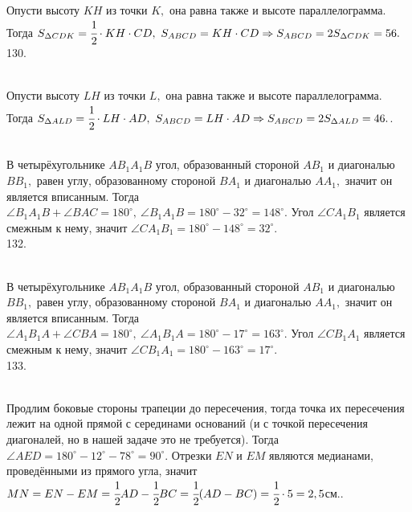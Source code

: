 Опусти высоту $KH$ из точки $K,$ она равна также и высоте параллелограмма. Тогда $S_{\Delta CDK}=\cfrac{1}{2}\cdot KH\cdot CD,\ S_{ABCD}=KH\cdot CD\Rightarrow
S_{ABCD}=2S_{\Delta CDK}=56.$\\
130. \begin{figure}[ht!]
\end{figure}\\
Опусти высоту $LH$ из точки $L,$ она равна также и высоте параллелограмма. Тогда $S_{\Delta ALD}=\cfrac{1}{2}\cdot LH\cdot AD,\ S_{ABCD}=LH\cdot AD\Rightarrow
S_{ABCD}=2S_{\Delta ALD}=46.$\newpage{}. \begin{figure}[ht!]
\end{figure}\\
В четырёхугольнике $AB_1A_1B$ угол, образованный стороной $AB_1$ и диагональю $BB_1,$ равен углу, образованному стороной $BA_1$ и диагональю $AA_1,$ значит он является вписанным. Тогда $\angle B_1A_1B+\angle BAC=180^\circ,\ \angle B_1A_1B=180^\circ-32^\circ=148^\circ.$ Угол $\angle CA_1B_1$ является смежным к нему, значит $\angle CA_1B_1=180^\circ-148^\circ=32^\circ.$\\
132. \begin{figure}[ht!]
\end{figure}\\
В четырёхугольнике $AB_1A_1B$ угол, образованный стороной $AB_1$ и диагональю $BB_1,$ равен углу, образованному стороной $BA_1$ и диагональю $AA_1,$ значит он является вписанным. Тогда $\angle A_1B_1A+\angle CBA=180^\circ,\ \angle A_1B_1A=180^\circ-17^\circ=163^\circ.$ Угол $\angle CB_1A_1$ является смежным к нему, значит $\angle CB_1A_1=180^\circ-163^\circ=17^\circ.$\\
133. \begin{figure}[ht!]
\end{figure}\\
Продлим боковые стороны трапеции до пересечения, тогда точка их пересечения лежит на одной прямой с серединами оснований (и с точкой пересечения диагоналей, но в нашей задаче это не требуется). Тогда $\angle AED=180^\circ-12^\circ-78^\circ=90^\circ.$ Отрезки $EN$ и $EM$ являются медианами, проведёнными из прямого угла, значит $MN=EN-EM=\cfrac{1}{2}AD-\cfrac{1}{2}BC=\cfrac{1}{2}(AD-BC)=\cfrac{1}{2}\cdot5=2,5$см.\newpage{}. \begin{figure}[ht!]
\end{figure}\\
